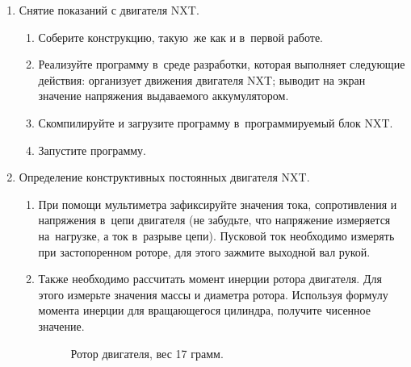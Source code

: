 \documentclass[12pt,a4paper,openany]{extarticle}
\begin{document}
\begin{enumerate}
\item Снятие показаний с двигателя NXT.
	\begin{enumerate}
	\item Соберите конструкцию, такую~же как и в~первой работе.
	\item Реализуйте программу в~среде разработки, которая выполняет следующие действия: организует движения двигателя NXT; выводит на экран значение напряжения выдаваемого аккумулятором.
	\item Скомпилируйте и загрузите программу в~программируемый блок NXT.
	\item Запустите программу.
	\end{enumerate}
\item Определение конструктивных постоянных двигателя NXT.
	\begin{enumerate}
	\item При помощи мультиметра зафиксируйте значения тока, сопротивления и напряжения в~цепи двигателя (не забудьте, что напряжение измеряется на~нагрузке, а ток в~разрыве цепи). Пусковой ток необходимо измерять при застопоренном роторе, для этого зажмите выходной вал рукой.
	\item Также необходимо рассчитать момент инерции ротора двигателя. Для этого измерьте значения массы и диаметра ротора. Используя формулу момента инерции для вращающегося цилиндра, получите чисенное значение.
	\begin{figure}[h]
		\noindent{}
		\caption{Ротор двигателя, вес 17 грамм.}
		\label{fig:transmition}

\end{figure}
\end{enumerate}
\end{enumerate}
\end{document}
